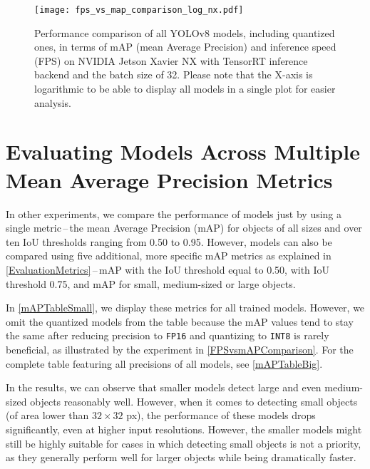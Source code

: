 \begin{figure}[H]
    \begin{framed}
        \centering
        \texttt{[image: fps\_vs\_map\_comparison\_log\_nx.pdf]}
        \caption{Performance comparison of all YOLOv8 models, including
        quantized ones, in terms of mAP (mean Average Precision) and inference
        speed (FPS) on NVIDIA Jetson Xavier NX with TensorRT inference backend
        and the batch size of 32. Please note that the X-axis is logarithmic to
        be able to display all models in a single plot for easier analysis.}
        \label{FPSvsmAPComparisonNX}
    \end{framed}
\end{figure}








\section{Evaluating Models Across Multiple Mean Average Precision Metrics}

In other experiments, we compare the performance of models just by
using a single metric\,--\,the mean Average Precision (mAP) for objects of all
sizes and over ten IoU thresholds ranging from \num{0.50} to \num{0.95}.
However, models can also be compared using five additional, more specific mAP
metrics as explained in \autoref{EvaluationMetrics}\,--\,mAP with the IoU
threshold equal to \num{0.50}, with IoU threshold \num{0.75}, and mAP for small,
medium-sized or large objects.

In \autoref{mAPTableSmall}, we display these metrics for all trained models.
However, we omit the quantized models from the table because the mAP values tend
to stay the same after reducing precision to \texttt{FP16} and quantizing to
\texttt{INT8} is rarely beneficial, as illustrated by the experiment in
\autoref{FPSvsmAPComparison}. For the complete table featuring all precisions of
all models, see \autoref{mAPTableBig}.

In the results, we can observe that smaller models detect large and even
medium-sized objects reasonably well. However, when it comes to detecting small
objects (of area lower than $32 \times 32$ px), the performance of these models
drops significantly, even at higher input resolutions. However, the smaller
models might still be highly suitable for cases in which detecting small objects
is not a priority, as they generally perform well for larger objects while being
dramatically faster.

